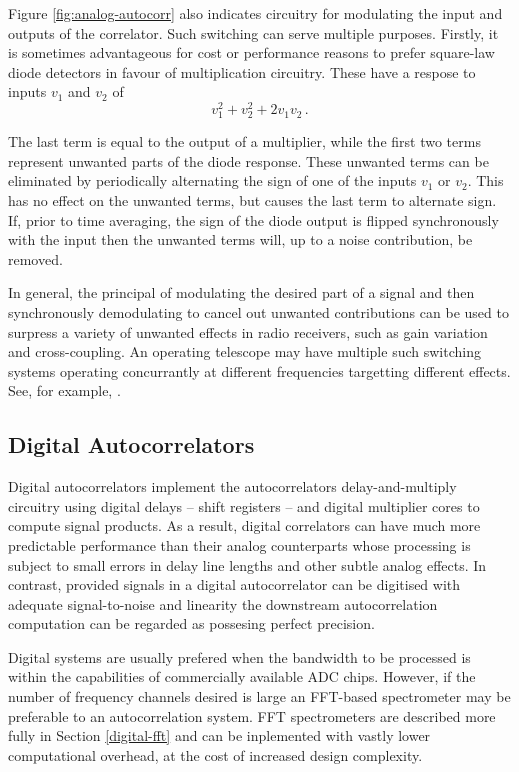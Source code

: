 \documentclass{article}
\begin{document}
Figure \ref{fig:analog-autocorr} also indicates circuitry for modulating the input and outputs of the correlator. Such switching can serve multiple purposes. Firstly, it is sometimes advantageous for cost or performance reasons to prefer square-law diode detectors in favour of multiplication circuitry. These have a respose to inputs $v_1$ and $v_2$ of
\begin{equation}
 v_1^2 + v_2^2 + 2v_1v_2 \, .
\end{equation}

The last term is equal to the output of a multiplier, while the first two terms represent unwanted parts of the diode response. These unwanted terms can be eliminated by periodically alternating the sign of one of the inputs $v_1$ or $v_2$. This has no effect on the unwanted terms, but causes the last term to alternate sign. If, prior to time averaging, the sign of the diode output is flipped synchronously with the input then the unwanted terms will, up to a noise contribution, be removed.

In general, the principal of modulating the desired part of a signal and then synchronously demodulating to cancel out unwanted contributions can be used to surpress a variety of unwanted effects in radio receivers, such as gain variation and cross-coupling. An operating telescope may have multiple such switching systems operating concurrantly at different frequencies targetting different effects. See, for example, \cite{Erickson2007}. 


\subsection{Digital Autocorrelators}\label{digital-autocorrelators}
Digital autocorrelators implement the autocorrelators delay-and-multiply circuitry using digital delays -- shift registers -- and digital multiplier cores to compute signal products. As a result, digital correlators can have much more predictable performance than their analog counterparts whose processing is subject to small errors in delay line lengths and other subtle analog effects. In contrast, provided signals in a digital autocorrelator can be digitised with adequate signal-to-noise and linearity the downstream autocorrelation computation can be regarded as possesing perfect precision.

Digital systems are usually prefered when the bandwidth to be processed is within the capabilities of commercially available ADC chips. However, if the number of frequency channels desired is large an FFT-based spectrometer may be preferable to an autocorrelation system. FFT spectrometers are described more fully in Section \ref{digital-fft} and can be inplemented with vastly lower computational overhead, at the cost of increased design complexity.
\end{document}
